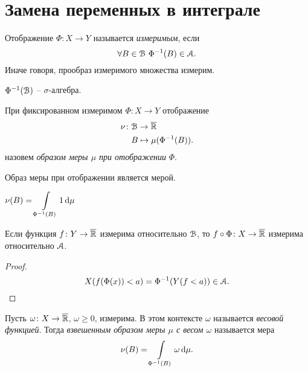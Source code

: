 \section{Замена переменных в интеграле}

\begin{definition}
    
    Отображение $\Phi \colon X \to Y$ называется \textit{измеримым}, если
\[
    \forall B \in \mathcal{B}~ \Phi^{-1}(B) \in \mathcal{A}
.\] 
    Иначе говоря, прообраз измеримого множества измерим.
\end{definition}

\begin{lemma}
    $\Phi^{-1}(\mathcal{B})$ -- $\sigma$-алгебра.
\end{lemma}

\begin{definition}
    При фиксированном измеримом $\Phi \colon X \to Y$ отображение
    \begin{align*}
        \nu \colon &\mathcal{B} \to \overline{\mathbb{R}} \\ 
                   &B \mapsto \mu(\Phi^{-1}(B))
    .\end{align*}
    назовем \textit{образом меры $\mu$ при отображении} $\Phi$.
\end{definition}

\begin{lemma}
    Образ меры при отображении является мерой.
\end{lemma}

\begin{remark}
    $\displaystyle \nu(B) = \int\limits_{\Phi^{-1}(B)}{1 \,\mathrm{d}\mu}$
\end{remark}

\begin{lemma}
    Если функция $f \colon Y \to \overline{\mathbb{R}}$ измерима относительно $\mathcal{B}$, 
    то $f \circ \Phi \colon X \to \overline{\mathbb{R}}$ измерима относительно $\mathcal{A}$.
\end{lemma}
\begin{proof}
    \[
        X(f(\Phi(x)) < a) = \Phi^{-1}(Y(f < a)) \in \mathcal{A}
    .\]
\end{proof}

\begin{definition}
    Пусть $\omega \colon X \to \overline{\mathbb{R}}$, $\omega \geqslant 0$, измерима.
    В этом контексте $\omega$ называется \textit{весовой функцией}. Тогда
    \textit{взвешенным образом меры $\mu$ с весом $\omega$} называется мера
    \begin{align*}
        \nu(B) = \int\limits_{\Phi^{-1}(B)}{\omega \,\mathrm{d}\mu}    
    .\end{align*}
\end{definition}

